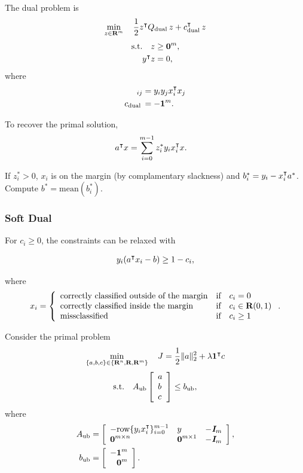 \documentclass{article}
\begin{document}
    The dual problem is \cite[p.~313]{ml}
    \begin{align*}
        \min_{z\in\textbf{R}^m}\quad \frac{1}{2}z^\intercal Q_{\text{dual}\:} z+c_{\text{dual}\:}^\intercal z
    \end{align*}
    \begin{align*}
        \text{s.t.}\quad z&\geq \textbf{0}^m,\\
        y^\intercal z &=0,
    \end{align*}
    where
    \begin{align*}
        [Q_{\text{dual}\:}]_{ij}
        &=y_i y_j x_i^\tp x_j \\
        c_{\text{dual}\:}&=-\ones^m.
    \end{align*}

    To recover the primal solution,
    \begin{align*}
        a^\intercal x &= \sum_{i=0}^{m-1} z_i^* y_i x_i^\intercal x.
    \end{align*}

    If $z_i^*>0$, $x_i$ is on the margin (by complamentary slackness) and $b_i^*=y_i-x_i^\intercal a^*$.
    Compute $b^*=\text{mean}(b_i^*)$.

    \clearpage
\subsubsection{Soft Dual}

    For $c_i\geq0$, the constraints can be relaxed with 

    \begin{align*}
        y_i(a^\intercal x_i - b)\geq 1-c_i,
    \end{align*}

    where
    \begin{align*}
        x_i=\left\{\begin{array}{lllllllllllllllllll}
            \text{correctly classified outside of the margin} & \text{if}\quad c_i=0\\
            \text{correctly classified inside the margin} & \text{if}\quad c_i\in\textbf{R}(0,1)\\
            \text{missclassified} &  \text{if}\quad c_i\geq1
            \end{array}\right..
    \end{align*}    

    Consider the primal problem
    \begin{align*}
        \min_{\{a,b,c\}\in\{\textbf{R}^n,\textbf{R},\textbf{R}^m\}}\quad J = \frac{1}{2}\|a\|_2^2+\lambda \textbf{1}^\intercal c
    \end{align*}
    \begin{align*}
        \text{s.t.}\quad A_{\text{ub}}\left[\begin{array}{lllllllllllllllllll}a\\ b\\c\end{array}\right]\leq b_{\text{ub}},
    \end{align*}
    where
    \begin{align*}
        A_\ub&= \mat{-\row\{y_ix_i^\tp\}_{i=0}^{m-1} & y &-\eye_m\\
        \zeros^{m\times n} & \zeros^{m\times 1} & -\eye_m},\\
        b_\ub&=\mat{-\ones^m\\ \minus \zeros^m}.
    \end{align*}
\end{document}
